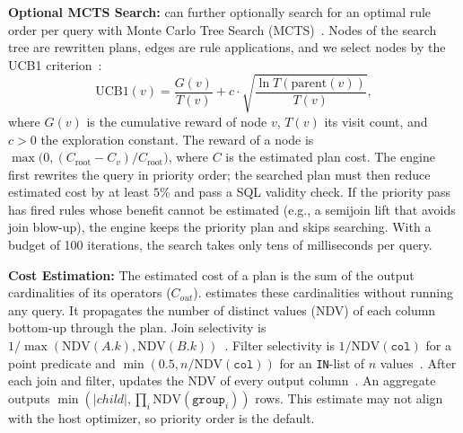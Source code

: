 \textbf{Optional MCTS Search:}
\label{sec:online:mcts}
{\sys} can further optionally search for an optimal rule order per query with Monte Carlo Tree Search (MCTS)~\cite{learnedrewrite}.
Nodes of the search tree are rewritten plans, edges are rule applications, and we select nodes by the UCB1 criterion~\cite{Auer02}:
\begin{equation}
\mathrm{UCB1}(v) = \frac{G(v)}{T(v)} + c \cdot \sqrt{\frac{\ln T(\mathrm{parent}(v))}{T(v)}},
\end{equation}
where $G(v)$ is the cumulative reward of node $v$, $T(v)$ its visit count, and $c > 0$ the exploration constant.
The reward of a node is $\max\bigl(0, (C_{\mathrm{root}} - C_{v})/C_{\mathrm{root}}\bigr)$, where $C$ is the estimated plan cost.
The engine first rewrites the query in priority order; the searched plan must then reduce estimated cost by at least $5\%$ and pass a SQL validity check. If the priority pass has fired rules whose benefit cannot be estimated (e.g., a semijoin lift that avoids join blow-up), the engine keeps the priority plan and skips searching. With a budget of 100 iterations, the search takes only tens of milliseconds per query.

\textbf{Cost Estimation:}
\label{sec:online:cost}
The estimated cost of a plan is the sum of the output cardinalities of its operators ($C_{out}$).
{\sys} estimates these cardinalities without running any query.
It propagates the number of distinct values (NDV) of each column bottom-up through the plan.
Join selectivity is $1/\max(\mathrm{NDV}(A.k), \mathrm{NDV}(B.k))$~\cite{Selinger79}.
Filter selectivity is $1/\mathrm{NDV}(\texttt{col})$ for a point predicate and $\min(0.5, n/\mathrm{NDV}(\texttt{col}))$ for an \texttt{IN}-list of $n$ values~\cite{Lohman88}.
After each join and filter, {\sys} updates the NDV of every output column~\cite{NeumannM11}.
An aggregate outputs $\min(|\mathit{child}|, \prod_i \mathrm{NDV}(\texttt{group}_i))$ rows.
This estimate may not align with the host optimizer, so priority order is the default.


